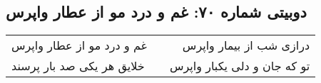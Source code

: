 \begin{center}
\section*{دوبیتی شماره ۷۰: غم و درد مو از عطار واپرس}
\label{sec:070}
\begin{longtable}{l p{0.5cm} r}
غم و درد مو از عطار واپرس
&&
درازی شب از بیمار واپرس
\\
خلایق هر یکی صد بار پرسند
&&
تو که جان و دلی یکبار واپرس
\\
\end{longtable}
\end{center}
